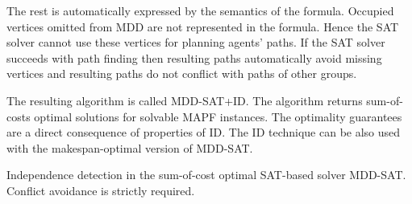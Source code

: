 \documentclass[jair,oneside,11pt]{article}
\begin{document}
The rest is automatically expressed by the semantics of the formula. Occupied vertices omitted from MDD are not represented in the formula. Hence the SAT solver cannot use these vertices for planning agents' paths. If the SAT solver succeeds with path finding then resulting paths automatically avoid missing vertices and resulting paths do not conflict with paths of other groups.

The resulting algorithm is called MDD-SAT+ID. The algorithm returns sum-of-costs optimal solutions for solvable MAPF instances. The optimality guarantees are a direct consequence of properties of ID. The ID technique can be also used with the makespan-optimal version of MDD-SAT.
	
\begin{algorithm}[h]
\begin{footnotesize}
 
\caption{Independence detection in the sum-of-cost optimal SAT-based solver MDD-SAT. Conflict avoidance is strictly required.}
\label{alg-MDD-SAT-ID}
\end{footnotesize}
\end{algorithm}
\end{document}
